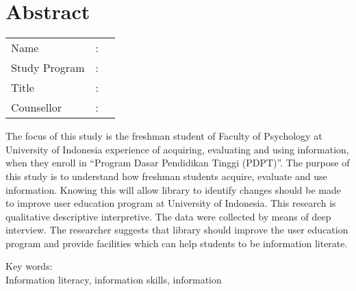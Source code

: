 %
%
%

\chapter*{Abstract}

\vspace*{0.2cm}
{
	\setlength{\parindent}{0pt}
	
	\begin{tabular}{@{}l l p{10cm}}
		Name&: & \penulis \\
		Study Program&: & \program \\
		Title&: & \judulInggris \\
		Counsellor&: & \pembimbing \\
	\end{tabular}

	\bigskip
	\bigskip

	The focus of this study is the freshman student of Faculty of Psychology at University of
	Indonesia experience of acquiring, evaluating and using information, when they enroll in
	“Program Dasar Pendidikan Tinggi (PDPT)”. The purpose of this study is to understand
	how freshman students acquire, evaluate and use information. Knowing this will allow
	library to identify changes should be made to improve user education program at
	University of Indonesia. This research is qualitative descriptive interpretive. The data
	were collected by means of deep interview. The researcher suggests that library should
	improve the user education program and provide facilities which can help students to be
	information literate.

	\bigskip

	Key words:\\
	Information literacy, information skills, information
}

\newpage